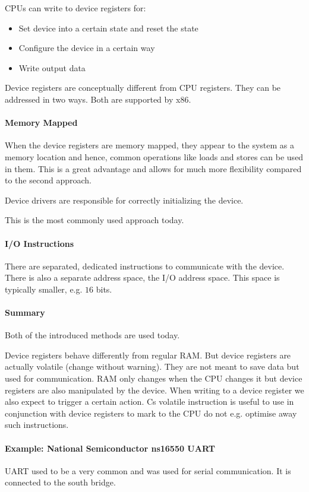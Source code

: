 CPUs can write to device registers for:
\begin{itemize}
    \item Set device into a certain state and reset the state
    \item Configure the device in a certain way
    \item Write output data
\end{itemize}

Device registers are conceptually different from CPU registers. They can be addressed in two ways. Both are supported by x86.

\paragraph{Memory Mapped}
When the device registers are memory mapped, they appear to the system as a memory location and hence, common operations like loads and stores can be used in them. This is a great advantage and allows for much more flexibility compared to the second approach.

Device drivers are responsible for correctly initializing the device.

This is the most commonly used approach today.

\paragraph{I/O Instructions}
There are separated, dedicated instructions to communicate with the device. There is also a separate address space, the I/O address space. This space is typically smaller, e.g. $16$ bits.

\paragraph{Summary}
Both of the introduced methods are used today.

Device registers behave differently from regular RAM. But device registers are actually volatile (change without warning). They are not meant to save data but used for communication. RAM only changes when the CPU changes it but device registers are also manipulated by the device. When writing to a device register we also expect to trigger a certain action. Cs volatile instruction is useful to use in conjunction with device registers to mark to the CPU do not e.g. optimise away such instructions.

\paragraph{Example: National Semiconductor ns16550 UART}
UART used to be a very common and was used for serial communication. It is connected to the south bridge.

